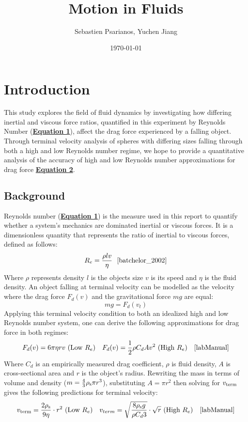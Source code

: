 \documentclass[
	letterpaper
	12pt
]{template}
\newcommand{\bref}[2]{\textbf{\hyperref[#1]{#2}}}
\begin{document}
\title{Motion in Fluids}

\author{Sebastien Psarianos, Yuchen Jiang}

\date{\today}
\maketitle
\section{Introduction}
This study explores the field of fluid dynamics by investigating how differing inertial and viscous force ratios, quantified in this experiment by Reynolds Number (\bref{eqn::reynolds}{Equation 1}), affect the drag force experienced by a falling object. Through terminal velocity analysis of spheres with differing sizes falling through both a high and low Reynolds number regime, we hope to provide a quantitative analysis of the accuracy of high and low Reynolds number approximations for drag force \bref{eqn::dragForce}{Equation 2}.

\subsection{Background}
Reynolds number (\bref{reynolds}{Equation 1}) is the measure used in this report to quantify whether a system's mechanics are dominated inertial or viscous forces. It is a dimensionless quantity that represents the ratio of inertial to viscous forces, defined as follows:
\begin{equation}\label{eqn::reynolds}
	R_e = \frac{\rho l v}{\eta}\ \ \text{\cite{batchelor_2002}}
\end{equation}
Where $\rho$ represents density $l$ is the objects size $v$ is its speed and $\eta$ is the fluid density. An object falling at terminal velocity can be modelled as the velocity where the drag force $F_d(v)$ and the gravitational force $mg$ are equal:
\[mg = F_d(v_{t})\]
Applying this terminal velocity condition to both an idealized high and low Reynolds number system, one can derive the following approximations for drag force in both regimes:
\begin{align}\label{eqn::dragForce}
	F_d(v) = 6\pi\eta r v \text{ (Low $R_e$)} && F_d(v) = {1\over 2}\rho C_dAv^2 \text{ (High $R_e$)} && \cite{labManual}
\end{align}
Where $C_d$ is an empirically measured drag coefficient, $\rho$ is fluid density, $A$ is cross-sectional area and $r$ is the object's radius. Rewriting the mass in terms of volume and density ($m =  {4\over 3}\rho_{\rm s}\pi r^3$), substituting $A=\pi r^2$ then solving for $v_{\rm term}$ gives the following predictions for terminal velocity:
\begin{align}\label{eqn::terminalVelocity}
	v_{\rm term}  = {2\rho_{\rm s} \over 9 \eta}\cdot r^2 \text{ (Low $R_e$)} && 	v_{term} =\sqrt{8\rho_{\rm s} g\over \rho C_d  3}\cdot \sqrt{r} \text{ (High $R_e$)}
	&& \cite{labManual}
\end{align}
\end{document}
